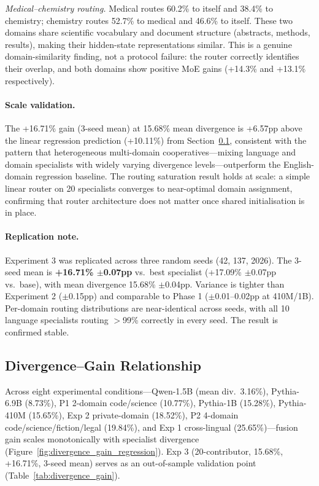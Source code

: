 \documentclass{article}
\begin{document}
\emph{Medical--chemistry routing.} Medical routes 60.2\% to itself and 38.4\% to chemistry; chemistry routes 52.7\% to medical and 46.6\% to itself. These two domains share scientific vocabulary and document structure (abstracts, methods, results), making their hidden-state representations similar. This is a genuine domain-similarity finding, not a protocol failure: the router correctly identifies their overlap, and both domains show positive MoE gains (+14.3\% and +13.1\% respectively).

\paragraph{Scale validation.} The +16.71\% gain (3-seed mean) at 15.68\% mean divergence is +6.57pp above the linear regression prediction (+10.11\%) from Section~\ref{sec:divergence_gain}, consistent with the pattern that heterogeneous multi-domain cooperatives---mixing language and domain specialists with widely varying divergence levels---outperform the English-domain regression baseline. The routing saturation result holds at scale: a simple linear router on 20 specialists converges to near-optimal domain assignment, confirming that router architecture does not matter once shared initialisation is in place.

\paragraph{Replication note.} Experiment 3 was replicated across three random seeds (42, 137, 2026). The 3-seed mean is \textbf{+16.71\% $\pm$0.07pp} vs.\ best specialist (+17.09\% $\pm$0.07pp vs.\ base), with mean divergence 15.68\% $\pm$0.04pp. Variance is tighter than Experiment 2 ($\pm$0.15pp) and comparable to Phase 1 ($\pm$0.01--0.02pp at 410M/1B). Per-domain routing distributions are near-identical across seeds, with all 10 language specialists routing $>$99\% correctly in every seed. The result is confirmed stable.

\subsection{Divergence--Gain Relationship}
\label{sec:divergence_gain}

Across eight experimental conditions---Qwen-1.5B (mean div.\ 3.16\%), Pythia-6.9B (8.73\%), P1 2-domain code/science (10.77\%), Pythia-1B (15.28\%), Pythia-410M (15.65\%), Exp 2 private-domain (18.52\%), P2 4-domain code/science/fiction/legal (19.84\%), and Exp 1 cross-lingual (25.65\%)---fusion gain scales monotonically with specialist divergence (Figure~\ref{fig:divergence_gain_regression}). Exp 3 (20-contributor, 15.68\%, +16.71\%, 3-seed mean) serves as an out-of-sample validation point (Table~\ref{tab:divergence_gain}).
\end{document}

